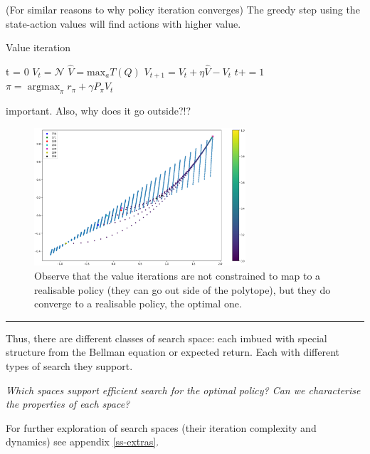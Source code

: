 (For similar reasons to why policy iteration converges) The greedy step using the
state-action values will find actions with higher value.

\begin{algorithm}
\caption{Value iteration}
\begin{algorithmic}[1]

  \State t = 0
  \State $V_t = \mathcal N$ 
    \State $\hat V = \text{max}_a T(Q)$  
    \State $V_{t+1} = V_t + \eta \hat V - V_t$ 
    \State $t += 1$
  \EndWhile
  \State $\pi = \mathop{\text{argmax}}_{\pi} r_{\pi} + \gamma P_{\pi}V_t$
  \State \algorithmicreturn{ $\pi$}
\EndProcedure

\end{algorithmic}
\end{algorithm}

{\color{red}important. Also, why does it go outside?!?}

\begin{figure}[h!]
\centering
\includegraphics[width=0.7\textwidth,height=0.35\textheight]{../../pictures/figures/vi-polytope.png}
\caption{Observe that the value iterations are not constrained to map to a realisable policy
(they can go out side of the polytope), but they do converge to a realisable policy,
the optimal one.}
\end{figure}



\begin{center}\rule{0.5\linewidth}{\linethickness}\end{center}

Thus, there are different classes of search space: each imbued with special
structure from the Bellman equation or expected return. Each with different types of search they
support.

\begin{displayquote}
\textit{Which spaces support efficient search for the optimal policy? Can we characterise the properties of each space?}
\end{displayquote}

For further exploration of search spaces (their iteration complexity and dynamics) see appendix \ref{ss-extras}.

